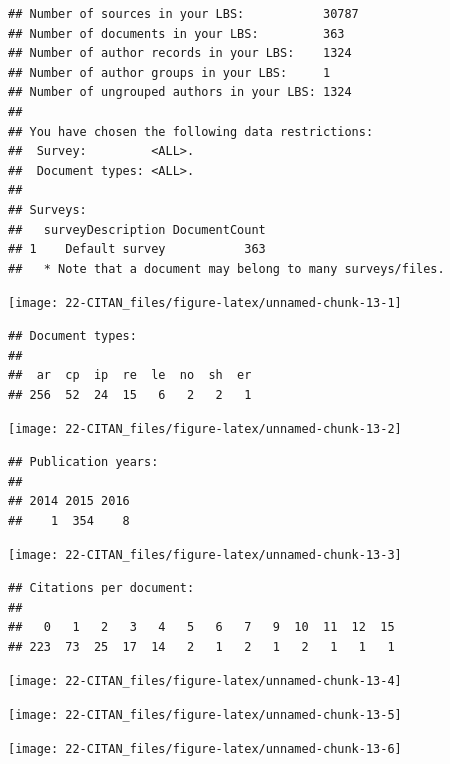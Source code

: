 \documentclass[]{book}
\begin{document}
\begin{verbatim}
## Number of sources in your LBS:           30787
## Number of documents in your LBS:         363
## Number of author records in your LBS:    1324
## Number of author groups in your LBS:     1
## Number of ungrouped authors in your LBS: 1324
## 
## You have chosen the following data restrictions:
##  Survey:         <ALL>.
##  Document types: <ALL>.
## 
## Surveys:
##   surveyDescription DocumentCount
## 1    Default survey           363
##   * Note that a document may belong to many surveys/files.
\end{verbatim}

\begin{center}\texttt{[image: 22-CITAN\_files/figure-latex/unnamed-chunk-13-1]} \end{center}

\begin{verbatim}
## Document types:
## 
##  ar  cp  ip  re  le  no  sh  er 
## 256  52  24  15   6   2   2   1
\end{verbatim}

\begin{center}\texttt{[image: 22-CITAN\_files/figure-latex/unnamed-chunk-13-2]} \end{center}

\begin{verbatim}
## Publication years:
## 
## 2014 2015 2016 
##    1  354    8
\end{verbatim}

\begin{center}\texttt{[image: 22-CITAN\_files/figure-latex/unnamed-chunk-13-3]} \end{center}

\begin{verbatim}
## Citations per document:
## 
##   0   1   2   3   4   5   6   7   9  10  11  12  15 
## 223  73  25  17  14   2   1   2   1   2   1   1   1
\end{verbatim}

\begin{center}\texttt{[image: 22-CITAN\_files/figure-latex/unnamed-chunk-13-4]} \end{center}

\begin{center}\texttt{[image: 22-CITAN\_files/figure-latex/unnamed-chunk-13-5]} \end{center}

\begin{center}\texttt{[image: 22-CITAN\_files/figure-latex/unnamed-chunk-13-6]} \end{center}
\end{document}
